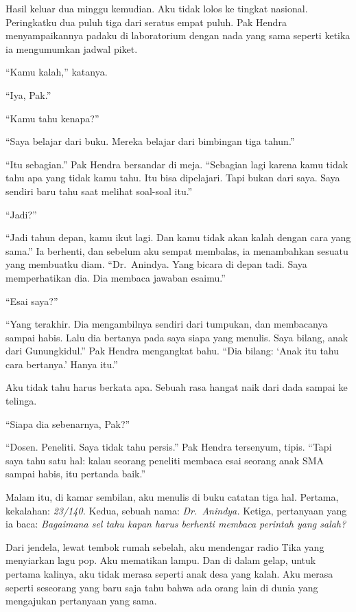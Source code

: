 \documentclass[11pt,twoside,openany]{book}
\begin{document}
Hasil keluar dua minggu kemudian. Aku tidak lolos ke tingkat nasional. Peringkatku dua puluh tiga dari seratus empat puluh. Pak Hendra menyampaikannya padaku di laboratorium dengan nada yang sama seperti ketika ia mengumumkan jadwal piket.

``Kamu kalah,'' katanya.

``Iya, Pak.''

``Kamu tahu kenapa?''

``Saya belajar dari buku. Mereka belajar dari bimbingan tiga tahun.''

``Itu sebagian.'' Pak Hendra bersandar di meja. ``Sebagian lagi karena kamu tidak tahu apa yang tidak kamu tahu. Itu bisa dipelajari. Tapi bukan dari saya. Saya sendiri baru tahu saat melihat soal-soal itu.''

``Jadi?''

``Jadi tahun depan, kamu ikut lagi. Dan kamu tidak akan kalah dengan cara yang sama.'' Ia berhenti, dan sebelum aku sempat membalas, ia menambahkan sesuatu yang membuatku diam. ``Dr.~Anindya. Yang bicara di depan tadi. Saya memperhatikan dia. Dia membaca jawaban esaimu.''

``Esai saya?''

``Yang terakhir. Dia mengambilnya sendiri dari tumpukan, dan membacanya sampai habis. Lalu dia bertanya pada saya siapa yang menulis. Saya bilang, anak dari Gunungkidul.'' Pak Hendra mengangkat bahu. ``Dia bilang: `Anak itu tahu cara bertanya.' Hanya itu.''

Aku tidak tahu harus berkata apa. Sebuah rasa hangat naik dari dada sampai ke telinga.

``Siapa dia sebenarnya, Pak?''

``Dosen. Peneliti. Saya tidak tahu persis.'' Pak Hendra tersenyum, tipis. ``Tapi saya tahu satu hal: kalau seorang peneliti membaca esai seorang anak SMA sampai habis, itu pertanda baik.''

Malam itu, di kamar sembilan, aku menulis di buku catatan tiga hal. Pertama, kekalahan: \emph{23/140.} Kedua, sebuah nama: \emph{Dr.~Anindya.} Ketiga, pertanyaan yang ia baca: \emph{Bagaimana sel tahu kapan harus berhenti membaca perintah yang salah?}

Dari jendela, lewat tembok rumah sebelah, aku mendengar radio Tika yang menyiarkan lagu pop. Aku mematikan lampu. Dan di dalam gelap, untuk pertama kalinya, aku tidak merasa seperti anak desa yang kalah. Aku merasa seperti seseorang yang baru saja tahu bahwa ada orang lain di dunia yang mengajukan pertanyaan yang sama.
\end{document}
